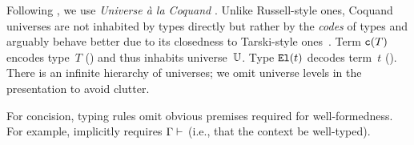Following \citet{kaposi2019gluing}, we use \emph{Universe à la Coquand} \cite{coquand2013presheaf}. Unlike Russell-style ones, Coquand universes are not inhabited by types directly but rather by the \emph{codes} of types
and arguably behave better due to its closedness to Tarski-style ones~\cite{luo2012notes}. 
Term $\texttt{c}({T})$ encodes type~$T$ () and thus inhabits universe~$\mathbb{U}$.
Type $\texttt{El}({t})$ decodes term~$t$ ().
There is an infinite hierarchy of universes;
we omit universe levels in the presentation to avoid clutter.

For concision, typing rules omit obvious premises required for well-formedness.
For example,  implicitly requires $ {\Gamma} \vdash_{} $
(i.e., that the context be well-typed).

